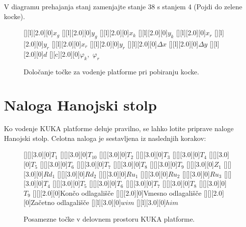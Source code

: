 \begin{enumerate}
\begin{mdframed}[backgroundcolor=yellow!20, shadow=true,roundcorner=8pt]
V diagramu prehajanja stanj zamenjajte stanje 38 s stanjem 4 (Pojdi do zelene kocke).

\end{mdframed}

\begin{figure}[h]
[][l][2.0][0]{$x_g$}
[][l][2.0][0]{$y_g$}
[][l][2.0][0]{$x_k$}
[][l][2.0][0]{$y_k$}
[][l][2.0][0]{$x_r$}
[][l][2.0][0]{$y_r$}
[][l][2.0][0]{$x_r$}
[][l][2.0][0]{$y_r$}
[][l][2.0][0]{$\Delta x$}
[][l][2.0][0]{$\Delta y$}
[][l][2.0][0]{$d$}
[][c][2.0][0]{$\varphi_k,\,\, \varphi_r$}
\centering {}
\caption{Določanje točke za vodenje platforme pri pobiranju kocke.}
\label{fig:KUKAKocka}
\end{figure}

\end{enumerate}

\section{Naloga Hanojski stolp}

Ko vodenje KUKA platforme deluje pravilno, se lahko lotite priprave naloge Hanojski stolp. Celotna naloga je sestavljena iz naslednjih korakov:

\begin{figure}[h]
[][][3.0][0]{$T_1$}
[][][3.0][0]{$T_{10}$}
[][][3.0][0]{$T_2$}
[][][3.0][0]{$T_3$}
[][][3.0][0]{$T_4$}
[][][3.0][0]{$T_5$}
[][][3.0][0]{$T_6$}
[][][3.0][0]{$T_7$}
[][][3.0][0]{$T_8$}
[][][3.0][0]{$T_9$}
[][][3.0][0]{$Z_1$}
[][][3.0][0]{$Rd_1$}
[][][3.0][0]{$Rd_2$}
[][][3.0][0]{$Ru_1$}
[][][3.0][0]{$Ru_2$}
[][][3.0][0]{$Ru_3$}
[][][3.0][0]{$T_4$}
[][][3.0][0]{$T_5$}
[][][3.0][0]{$T_6$}
[][][3.0][0]{$T_7$}
[][][3.0][0]{$T_8$}
[][][3.0][0]{$T_9$}
[][][2.0][0]{Končo odlagališče}
[][][2.0][0]{Vmesno odlagališče}
[][][2.0][0]{Začetno odlagališče}
[][l][3.0][0]{$wim$}
[][l][3.0][0]{$him$}
\centering {}
\caption{Posamezne točke v delovnem prostoru KUKA platforme.}
\label{fig:AllTocke}
\end{figure}


